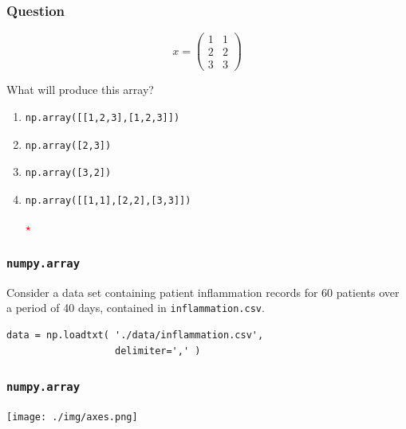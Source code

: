 \documentclass[11pt]{beamer}
\newcommand{\correctstar}{\textcolor{red}{$\star$}}
\begin{document}
\begin{frame}[fragile]
  \frametitle{Question}
  \Enlarge

$$
x =
\left(
\begin{array}{cc}
1 & 1 \\
2 & 2 \\
3 & 3
\end{array}
\right)
$$

  What will produce this array?

  \begin{enumerate}[label=\Alph*]
  \item
  \begin{Verbatim}
np.array([[1,2,3],[1,2,3]])
  \end{Verbatim}
  \item
  \begin{Verbatim}
np.array([2,3])
  \end{Verbatim}
  \item
  \begin{Verbatim}
np.array([3,2])
  \end{Verbatim}
  \item
  \begin{Verbatim}
np.array([[1,1],[2,2],[3,3]])
  \end{Verbatim}
  \correctstar
  \end{enumerate}
\end{frame}


\begin{frame}[fragile]
  \frametitle{\texttt{numpy.array}}
  \Enlarge

  Consider a data set containing patient inflammation records for 60 patients over a period of 40 days, contained in \texttt{inflammation.csv}.

  \begin{Verbatim}
data = np.loadtxt( './data/inflammation.csv',
                   delimiter=',' )
  \end{Verbatim}
\end{frame}

\begin{frame}[fragile]
  \frametitle{\texttt{numpy.array}}
  \Enlarge

  \texttt{[image: ./img/axes.png]}
\end{frame}
\end{document}
